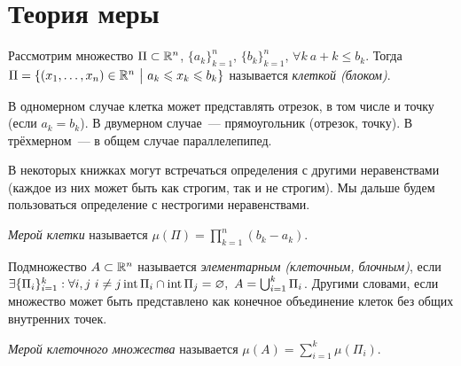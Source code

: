 \documentclass[../main.tex]{subfiles}
\begin{document}
\section{Теория меры}

\begin{definition}
    Рассмотрим множество $\Pi \subset \mathbb{R}^n$, $\{a_k\}_{k=1}^n$, $\{b_k\}_{k=1}^n$, $\forall k\ a+k \leq b_k$. Тогда $\Pi = \{ (x_1, \dots, x_n) \in \mathbb{R}^n \ \big|\  a_k \leqslant x_k \leqslant b_k \}$ называется \emph{клеткой (блоком)}. 
\end{definition}

\begin{example}
    В одномерном случае клетка может представлять отрезок, в том числе и точку (если $a_k = b_k$). В двумерном случае~--- прямоугольник (отрезок, точку). В трёхмерном~--- в общем случае параллелепипед.
\end{example}

\begin{note}
    В некоторых книжках могут встречаться определения с другими неравенствами (каждое из них может быть как строгим, так и не строгим). Мы дальше будем пользоваться определение с нестрогими неравенствами.
\end{note}

\begin{definition}
    \emph{Мерой клетки} называется $\mu (\Pi) = \prod_{k=1}^n (b_k - a_k)$.
\end{definition}

\begin{definition}
    Подмножество $A \subset \mathbb{R}^n$ называется \emph{элементарным (клеточным, блочным)}, если $\exists \{\Pi_i\}_{i=1}^k: \forall i,j\ i \neq j \operatorname{int} \Pi_i \cap \operatorname{int} \Pi_j = \varnothing,\ A = \bigcup_{i=1}^k \Pi_i$.
    Другими словами, если множество может быть представлено как конечное объединение клеток без общих внутренних точек.
\end{definition}

\begin{definition}
    \emph{Мерой клеточного множества} называется $\mu(A) = \sum_{i=1}^k \mu(\Pi_i)$.
\end{definition}
\end{document}
